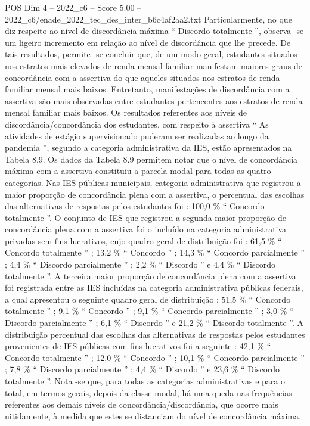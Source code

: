 \begin{textsample}{POS Dim 4 – 2022\_c6 – Score 5.00 – 2022\_c6/enade\_2022\_tec\_des\_inter\_b6c4af2aa2.txt}
Particularmente, no que diz respeito ao nível de discordância máxima “ Discordo totalmente ”, observa -se um ligeiro incremento em relação ao nível de discordância que lhe precede.
De tais resultados, permite -se concluir que, de um modo geral, estudantes situados nos estratos mais elevados de renda mensal familiar manifestam maiores graus de concordância com a assertiva do que aqueles situados nos estratos de renda familiar mensal mais baixos.
Entretanto, manifestações de discordância com a assertiva são mais observadas entre estudantes pertencentes aos estratos de renda mensal familiar mais baixos.
Os resultados referentes aos níveis de discordância/concordância dos estudantes, com respeito à assertiva “ As atividades de estágio supervisionado puderam ser realizadas ao longo da pandemia ”, segundo a categoria administrativa da IES, estão apresentados na Tabela 8.9.
Os dados da Tabela 8.9 permitem notar que o nível de concordância máxima com a assertiva constituiu a parcela modal para todas as quatro categorias.
Nas IES públicas municipais, categoria administrativa que registrou a maior proporção de concordância plena com a assertiva, o percentual das escolhas das alternativas de respostas pelos estudantes foi : 100,0 \% “ Concordo totalmente ”.
O conjunto de IES que registrou a segunda maior proporção de concordância plena com a assertiva foi o incluído na categoria administrativa privadas sem fins lucrativos, cujo quadro geral de distribuição foi : 61,5 \% “ Concordo totalmente ” ; 13,2 \% “ Concordo ” ; 14,3 \% “ Concordo parcialmente ” ; 4,4 \% “ Discordo parcialmente ” ; 2,2 \% “ Discordo ” e 4,4 \% “ Discordo totalmente ”.
A terceira maior proporção de concordância plena com a assertiva foi registrada entre as IES incluídas na categoria administrativa públicas federais, a qual apresentou o seguinte quadro geral de distribuição : 51,5 \% “ Concordo totalmente ” ; 9,1 \% “ Concordo ” ; 9,1 \% “ Concordo parcialmente ” ; 3,0 \% “ Discordo parcialmente ” ; 6,1 \% “ Discordo ” e 21,2 \% “ Discordo totalmente ”.
A distribuição percentual das escolhas das alternativas de respostas pelos estudantes provenientes de IES públicas com fins lucrativos foi a seguinte : 42,1 \% “ Concordo totalmente ” ; 12,0 \% “ Concordo ” ; 10,1 \% “ Concordo parcialmente ” ; 7,8 \% “ Discordo parcialmente ” ; 4,4 \% “ Discordo ” e 23,6 \% “ Discordo totalmente ”.
Nota -se que, para todas as categorias administrativas e para o total, em termos gerais, depois da classe modal, há uma queda nas frequências referentes aos demais níveis de concordância/discordância, que ocorre mais nitidamente, à medida que estes se distanciam do nível de concordância máxima.

\end{textsample}
